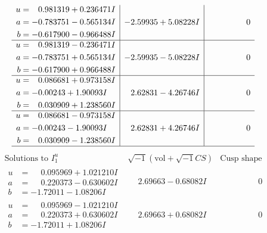 \documentclass[1p]{elsarticle_modified}
\theoremstyle{definition}
\newcommand{\I}{\sqrt{-1}}
\begin{document}
$$\begin{array}{c|c|c}
\begin{aligned}
u &= \phantom{-}0.981319 + 0.236471 I \\
a &= -0.783751 - 0.565134 I \\
b &= -0.617900 - 0.966488 I\end{aligned}
 & -2.59935 + 5.08228 I & \phantom{-0.000000 } 0 \\ \hline\begin{aligned}
u &= \phantom{-}0.981319 - 0.236471 I \\
a &= -0.783751 + 0.565134 I \\
b &= -0.617900 + 0.966488 I\end{aligned}
 & -2.59935 - 5.08228 I & \phantom{-0.000000 } 0 \\ \hline\begin{aligned}
u &= \phantom{-}0.086681 + 0.973158 I \\
a &= -0.00243 + 1.90093 I \\
b &= \phantom{-}0.030909 + 1.238560 I\end{aligned}
 & \phantom{-}2.62831 - 4.26746 I & \phantom{-0.000000 } 0 \\ \hline\begin{aligned}
u &= \phantom{-}0.086681 - 0.973158 I \\
a &= -0.00243 - 1.90093 I \\
b &= \phantom{-}0.030909 - 1.238560 I\end{aligned}
 & \phantom{-}2.62831 + 4.26746 I & \phantom{-0.000000 } 0\\
 \hline 
 \end{array}$$\newpage$$\begin{array}{c|c|c}  
\text{Solutions to }I^u_{1}& \I (\text{vol} + \sqrt{-1}CS) & \text{Cusp shape}\\
 \hline 
\begin{aligned}
u &= \phantom{-}0.095969 + 1.021210 I \\
a &= \phantom{-}0.220373 - 0.630602 I \\
b &= -1.72011 - 1.08206 I\end{aligned}
 & \phantom{-}2.69663 - 0.68082 I & \phantom{-0.000000 } 0 \\ \hline\begin{aligned}
u &= \phantom{-}0.095969 - 1.021210 I \\
a &= \phantom{-}0.220373 + 0.630602 I \\
b &= -1.72011 + 1.08206 I\end{aligned}
 & \phantom{-}2.69663 + 0.68082 I & \phantom{-0.000000 } 0 \\ \hline\begin{aligned}

\end{aligned}
\end{array}$$
\end{document}
